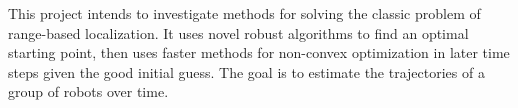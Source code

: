 This project intends to investigate methods for solving the classic problem of range-based localization. It uses novel robust algorithms to find an optimal starting point, then uses faster methods for non-convex optimization in later time steps given the good initial guess. The goal is to estimate the trajectories of a group of robots over time. 